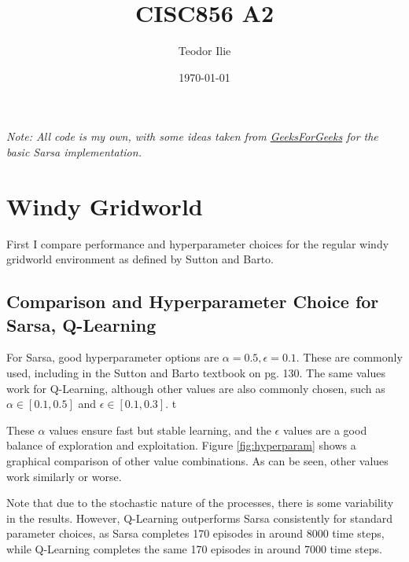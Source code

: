 \documentclass{article}
\title{CISC856 A2}
\author{Teodor Ilie}
\date{\today}
\begin{document}
\maketitle

\textit{Note: All code is my own, with some ideas taken from \href{https://www.geeksforgeeks.org/sarsa-reinforcement-learning/}{GeeksForGeeks} for the basic Sarsa implementation.}

\section{Windy Gridworld}
First I compare performance and hyperparameter choices for the regular windy gridworld environment as defined by Sutton and Barto.
\subsection{Comparison and Hyperparameter Choice for Sarsa, Q-Learning}
For Sarsa, good hyperparameter options are $\alpha = 0.5, \epsilon = 0.1$. These are commonly used, including in the Sutton and Barto textbook on pg. 130. The same values work for Q-Learning, although other values are also commonly chosen, such as $\alpha \in [0.1, 0.5]$ and $\epsilon \in [0.1, 0.3]$. t

These $\alpha$ values ensure fast but stable learning, and the $\epsilon$ values are a good balance of exploration and exploitation. Figure \ref{fig:hyperparam} shows a graphical comparison of other value combinations. As can be seen, other values work similarly or worse.

Note that due to the stochastic nature of the processes, there is some variability in the results. However, Q-Learning outperforms Sarsa consistently for standard parameter choices, as Sarsa completes 170 episodes in around 8000 time steps, while Q-Learning completes the same 170 episodes in around 7000 time steps.
\end{document}
